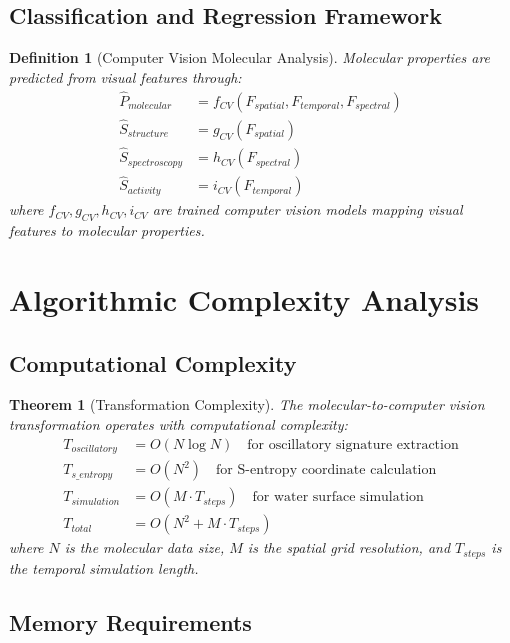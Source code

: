 \documentclass[12pt,a4paper]{article}
\newtheorem{theorem}{Theorem}
\newtheorem{definition}{Definition}
\begin{document}
\subsection{Classification and Regression Framework}

\begin{definition}[Computer Vision Molecular Analysis]
Molecular properties are predicted from visual features through:
\begin{align}
\hat{P}_{molecular} &= f_{CV}(F_{spatial}, F_{temporal}, F_{spectral}) \\
\hat{S}_{structure} &= g_{CV}(F_{spatial}) \\
\hat{S}_{spectroscopy} &= h_{CV}(F_{spectral}) \\
\hat{S}_{activity} &= i_{CV}(F_{temporal})
\end{align}
where $f_{CV}, g_{CV}, h_{CV}, i_{CV}$ are trained computer vision models mapping visual features to molecular properties.
\end{definition}

\section{Algorithmic Complexity Analysis}

\subsection{Computational Complexity}

\begin{theorem}[Transformation Complexity]
The molecular-to-computer vision transformation operates with computational complexity:
\begin{align}
T_{oscillatory} &= O(N \log N) \quad \text{for oscillatory signature extraction} \\
T_{s\_entropy} &= O(N^2) \quad \text{for S-entropy coordinate calculation} \\
T_{simulation} &= O(M \cdot T_{steps}) \quad \text{for water surface simulation} \\
T_{total} &= O(N^2 + M \cdot T_{steps})
\end{align}
where $N$ is the molecular data size, $M$ is the spatial grid resolution, and $T_{steps}$ is the temporal simulation length.
\end{theorem}

\subsection{Memory Requirements}
\end{document}
